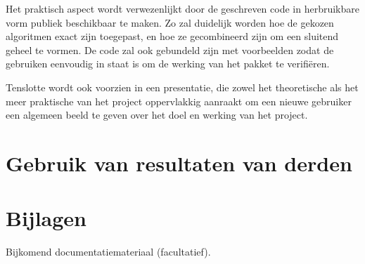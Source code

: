 \documentclass[]{book}
\begin{document}
Het praktisch aspect wordt verwezenlijkt door de geschreven code in herbruikbare vorm publiek beschikbaar te maken. Zo zal duidelijk worden hoe de gekozen algoritmen exact zijn toegepast, en hoe ze gecombineerd zijn om een sluitend geheel te vormen. De code zal ook gebundeld zijn met voorbeelden zodat de gebruiken eenvoudig in staat is om de werking van het pakket te verifi\"eren.

Tenslotte wordt ook voorzien in een presentatie, die zowel het theoretische als het meer praktische van het project oppervlakkig aanraakt om een nieuwe gebruiker een algemeen beeld te geven over het doel en werking van het project.

\section{Gebruik van resultaten van derden}\label{sec:Gebruik}


\section{Bijlagen} \label{sec:Bijlagen}
Bijkomend documentatiemateriaal (facultatief). 
\end{document}
